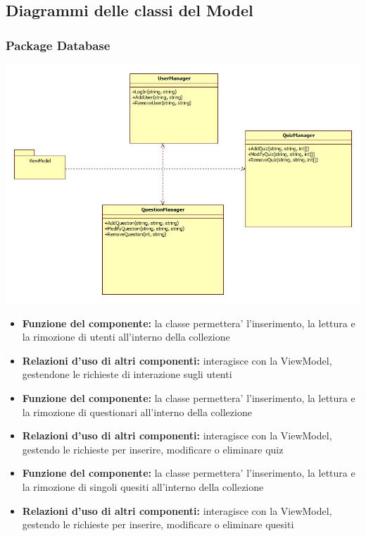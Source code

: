 \subsection{Diagrammi delle classi del Model}
			\subsubsection{Package Database}
			\begin{center}
				\includegraphics[scale=0.6]{../images/Database.jpg}
			\end{center}
 			\begin{itemize}
		    	\item\textbf{Funzione del componente:} la classe permettera' l'inserimento, la lettura e la rimozione di utenti all'interno della collezione
			\item\textbf{Relazioni d'uso di altri componenti:} interagisce con la ViewModel, gestendone le richieste di interazione sugli utenti

			\end{itemize}
			\begin{itemize}
		    	\item\textbf{Funzione del componente:} la classe permettera' l'inserimento, la lettura e la rimozione di questionari all'interno della collezione
			\item\textbf{Relazioni d'uso di altri componenti:} interagisce con la ViewModel, gestendo le richieste per inserire, modificare o eliminare quiz
			\end{itemize}
			\begin{itemize}
		    	\item\textbf{Funzione del componente:} la classe permettera' l'inserimento, la lettura e la rimozione di singoli quesiti all'interno della collezione
			\item\textbf{Relazioni d'uso di altri componenti:} interagisce con la ViewModel, gestendo le richieste per inserire, modificare o eliminare quesiti
			\end{itemize}
			
